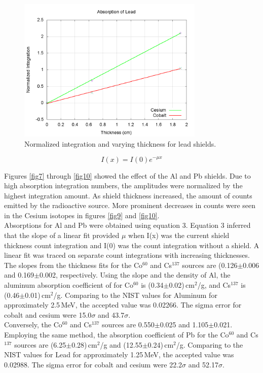 \documentclass[aps,prl,twocolumn,superscriptaddress,nofootinbib]{revtex4-1}
\begin{document}
\begin{figure}[h!]
  \begin{center}
\centerline{\includegraphics[width=3.5in]{muPb.png}}
\caption{ \small{Normalized integration and varying thickness for lead shields. \label{fig12}}}
  \end{center}
\end{figure}
\vfill\eject
\begin{equation}
I(x)=I(0)e^{-\mu x}
\end{equation}

Figures \ref{fig7} through \ref {fig10} showed the effect of the Al and Pb shields. Due to high absorption integration numbers, the amplitudes were normalized by the highest integration amount. As shield thickness increased, the amount of counts emitted by the radioactive source. More prominent decreases in counts were seen in the Cesium isotopes in figures \ref{fig9} and \ref{fig10}.
\\
\indent Absorptions for Al and Pb were obtained using equation 3. Equation 3 inferred  that the slope of a linear fit provided $\mu$ when I(x) was the current shield thickness count integration and I(0) was the count integration without a shield. A linear fit was traced on separate count integrations with increasing thicknesses. The slopes from the thickness fits for the Co$^{60}$ and Cs$^{137}$ sources are (0.126$\pm$0.006 and 0.169$\pm$0.002, respectively. Using the slope and the density of Al, the aluminum absorption coefficient of for Co$^60$ is (0.34$\pm$0.02)\,cm$^{2}$/g, and Cs$^137$ is (0.46$\pm$0.01)\,cm$^{2}$/g. Comparing to the NIST values for Aluminum for approximately 2.5\,MeV, the accepted value was 0.02266. The sigma error for cobalt and cesium were 15.0$\sigma$ and 43.7$\sigma$.
\\
\indent Conversely, the Co$^{60}$ and Cs$^{137}$ sources are 0.550$\pm$0.025 and 1.105$\pm$0.021. Employing the same method, the absorption coefficient of Pb for the Co$^{60}$ and Cs$^{137}$ sources are (6.25$\pm$0.28)\,cm$^{2}$/g and (12.55$\pm$0.24)\,cm$^{2}$/g. Comparing to the NIST values for Lead for approximately 1.25\,MeV, the accepted value was 0.02988. The sigma error for cobalt and cesium were 22.2$\sigma$ and 52.17$\sigma$.
\end{document}
